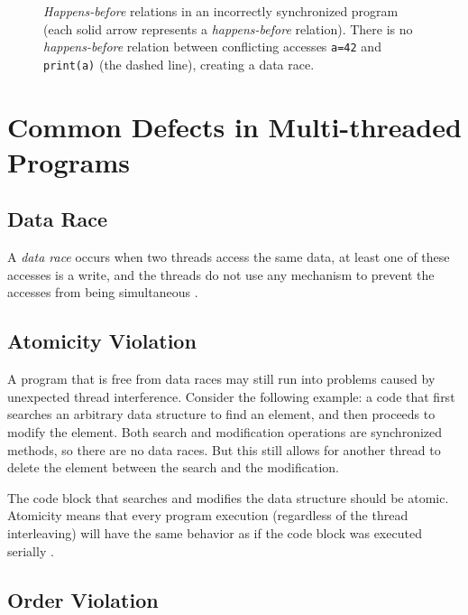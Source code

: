\begin{figure}[hbt]
    \label{hb2}
    
    \caption{\emph{Happens-before} relations in an incorrectly synchronized
    program (each solid arrow represents a \emph{happens-before} relation).
    There is no \emph{happens-before} relation between conflicting accesses
    \texttt{a=42} and \texttt{print(a)} (the dashed line), creating a data race.}
\end{figure}


\section{Common Defects in Multi-threaded Programs}


\subsection{Data Race}

A \emph{data race} occurs when two threads access the same data, at least
one of these accesses is a write, and the threads do not use any mechanism to
prevent the accesses from being simultaneous \cite{eraser}.



\subsection{Atomicity Violation}

A program that is free from data races may still run into problems caused by
unexpected thread interference. Consider the following example: a code that
first searches an arbitrary data structure to find an element, and then proceeds
to modify the element. Both search and modification operations are synchronized
methods, so there are no data races. But this still allows for another thread to
delete the element between the search and the modification.

The code block that searches and modifies the data structure should be atomic.
Atomicity means that every program execution (regardless of the thread
interleaving) will have the same behavior as if the code block was executed
serially \cite{atomizer}. \todo{}


\subsection{Order Violation}

